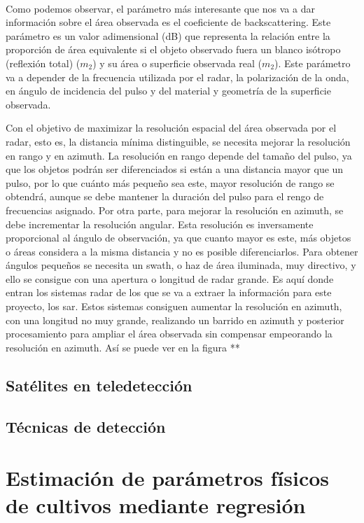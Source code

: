 \\
\par Como podemos observar, el parámetro más interesante que nos va a dar información sobre el área observada es el coeficiente de backscattering. Este parámetro es un valor adimensional (dB) que representa la relación entre la proporción de área equivalente si el objeto observado fuera un blanco isótropo (reflexión total) ($m_{2}$) y su área o superficie observada real ($m_{2}$). Este parámetro va a depender de la frecuencia utilizada por el radar, la polarización de la onda, en ángulo de incidencia del pulso y del material y geometría de la superficie observada.
\\
\par Con el objetivo de maximizar la resolución espacial del área observada por el radar, esto es, la distancia mínima distinguible, se necesita mejorar la resolución en rango y en azimuth. La resolución en rango depende del tamaño del pulso, ya que los objetos podrán ser diferenciados si están a una distancia mayor que un pulso, por lo que cuánto más pequeño sea este, mayor resolución de rango se obtendrá, aunque se debe mantener la duración del pulso para el rengo de frecuencias asignado. Por otra parte, para mejorar la resolución en azimuth, se debe incrementar la resolución angular. Esta resolución es inversamente proporcional al ángulo de observación, ya que cuanto mayor es este, más objetos o áreas considera a la misma distancia y no es posible diferenciarlos. Para obtener ángulos pequeños se necesita un swath, o haz de área iluminada, muy directivo, y ello se consigue con una apertura o longitud de radar grande. Es aquí donde entran los sistemas radar de los que se va a extraer la información para este proyecto, los \gls{sar}. Estos sistemas consiguen aumentar la resolución en azimuth, con una longitud no muy grande, realizando un barrido en azimuth y posterior procesamiento para ampliar el área observada sin compensar empeorando la resolución en azimuth. Así se puede ver en la figura **
\subsection{Satélites en teledetección}
\subsection{Técnicas de detección}
\section{Estimación de parámetros físicos de cultivos mediante regresión}
 